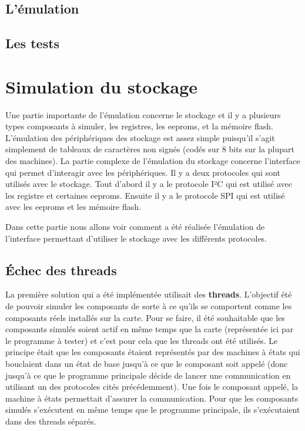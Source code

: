 \documentclass[a4paper]{article}
\begin{document}
\subsection{L'émulation}

\subsection{Les tests}

\section{Simulation du stockage}

Une partie importante de l'émulation concerne le stockage et il y a plusieurs
types composants à simuler, les registres, les eeproms, et la mémoire flash.
L'émulation des périphériques des stockage est assez simple puisqu'il s'agit
simplement de tableaux de caractères non signés (codés sur 8 bits sur la plupart
des machines). La partie complexe de l'émulation du stockage concerne
l'interface qui permet d'interagir avec les périphériques. Il y a deux
protocoles qui sont utilisés avec le stockage. Tout d'abord il y a le protocole
I²C qui est utilisé avec les registre et certaines eeproms. Ensuite il y a le
protocole SPI qui est utilisé avec les eeproms et les mémoire flash.

Dans cette partie nous allons voir comment a été réalisée l'émulation de
l'interface permettant d'utiliser le stockage avec les différents protocoles.

\subsection{Échec des threads}

La première solution qui a été implémentée utilisait des \textbf{threads}.
L'objectif été de pouvoir simuler les composants de sorte à ce qu'ils se
comportent comme les composants réels installés sur la carte. Pour se faire, il
été souhaitable que les composants simulés soient actif en même temps que la
carte (représentée ici par le programme à tester) et c'est pour cela que les
threads ont été utilisés. Le principe était que les composants étaient
représentés par des machines à états qui bouclaient dans un état de base jusqu'à
ce que le composant soit appelé (donc jusqu'à ce que le programme principale
décide de lancer une communication en utilisant un des protocoles cités
précédemment). Une fois le composant appelé, la machine à états permettait
d'assurer la communication. Pour que les composants simulés s'exécutent en même
temps que le programme principale, ils s'exécutaient dans des threads séparés.
\\
\end{document}
